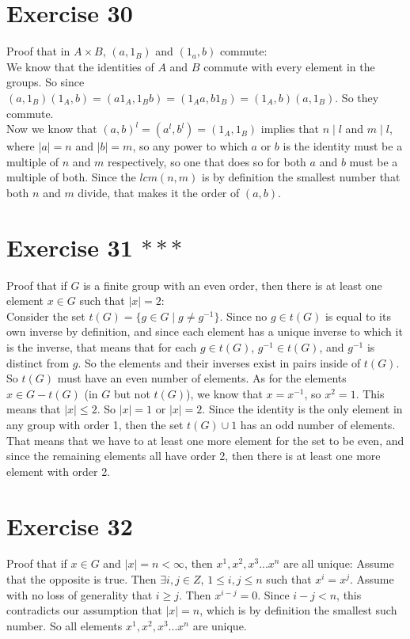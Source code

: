 \documentclass{article}
\begin{document}
    \section*{Exercise 30}
    Proof that in $A \times B$, $(a, 1_B)$ and $(1_a, b)$ commute: \\
    We know that the identities of $A$ and $B$ commute with every element
    in the groups.
    So since $(a, 1_B)(1_A, b)
    = (a1_A, 1_Bb)
    = (1_Aa, b1_B)
    = (1_A, b)(a, 1_B)$.
    So they commute. \\
    Now we know that $(a, b)^l = (a^l, b^l) = (1_A, 1_B)$
    implies that $n \mid l$ and $m \mid l$,
    where $|a| = n$ and $|b| = m$,
    so any power to which $a$ or $b$ is the identity must be
    a multiple of $n$ and $m$ respectively,
    so one that does so for both $a$ and $b$ must be a multiple of both.
    Since the $lcm(n, m)$ is by definition the smallest number that both
    $n$ and $m$ divide, that makes it the order of $(a, b)$. 

    \section*{Exercise 31 $***$}
    Proof that if $G$ is a finite group with an even order,
    then there is at least one element $x \in G$ such that $|x| = 2$: \\
    Consider the set $t(G) = \{g \in G \mid g \neq g^{-1}\}$.
    Since no $g \in t(G)$ is equal to its own inverse by definition,
    and since each element has a unique inverse to which it is the inverse,
    that means that for each $g \in t(G)$,
    $g^{-1} \in t(G)$, and $g^{-1}$ is distinct from $g$.
    So the elements and their inverses exist in pairs inside of $t(G)$.
    So $t(G)$ must have an even number of elements.
    As for the elements $x \in G - t(G)$ (in $G$ but not $t(G)$),
    we know that $x = x^{-1}$,
    so $x^2 = 1$.
    This means that $|x| \leqslant 2$.
    So $|x| = 1$ or $|x| = 2$.
    Since the identity is the only element in any group with order 1, 
    then the set $t(G) \cup {1}$ has an odd number of elements.
    That means that we have to at least one more element for the set to be
    even, and since the remaining elements all have order 2, then there is
    at least one more element with order 2.


    \section*{Exercise 32}
    Proof that if $x \in G$ and $|x| = n < \infty$,
    then $x^1, x^2, x^3 ... x^n$ are all unique:
    Assume that the opposite is true.
    Then $\exists i, j \in Z$, $1 \leqslant i, j \leqslant n$
    such that $x^i = x^j$.
    Assume with no loss of generality that $i \geqslant j$.
    Then $x^{i - j} = 0$.
    Since $i - j < n$, this contradicts our assumption that $|x| = n$,
    which is by definition the smallest such number.
    So all elements $x^1, x^2, x^3 ... x^n$ are unique. 
\end{document}
